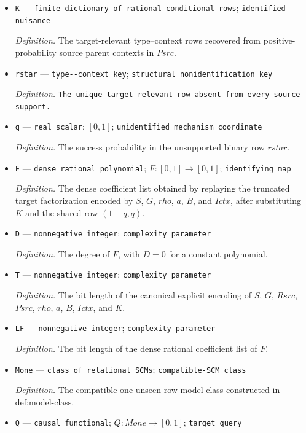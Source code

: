 \documentclass{article}
\begin{document}
\begin{itemize}
  \item \texttt{K} --- \texttt{finite dictionary of rational conditional rows}; \texttt{identified nuisance}
  \par\smallskip\noindent\emph{Definition.} The target-relevant type--context rows recovered from positive-probability source parent contexts in \(Psrc\).
  \item \texttt{rstar} --- \texttt{type-\allowbreak{}-\allowbreak{}context key}; \texttt{structural nonidentification key}
  \par\smallskip\noindent\emph{Definition.} \texttt{The unique target-\allowbreak{}relevant row absent from every source support.}
  \item \texttt{q} --- \texttt{real scalar}; \([0,1]\); \texttt{unidentified mechanism coordinate}
  \par\smallskip\noindent\emph{Definition.} The success probability in the unsupported binary row \(rstar\).
  \item \texttt{F} --- \texttt{dense rational polynomial}; \(F:[0,1]\to[0,1]\); \texttt{identifying map}
  \par\smallskip\noindent\emph{Definition.} The dense coefficient list obtained by replaying the truncated target factorization encoded by \(S\), \(G\), \(rho\), \(a\), \(B\), and \(Ictx\), after substituting \(K\) and the shared row \((1-q,q)\).
  \item \texttt{D} --- \texttt{nonnegative integer}; \texttt{complexity parameter}
  \par\smallskip\noindent\emph{Definition.} The degree of \(F\), with \(D=0\) for a constant polynomial.
  \item \texttt{T} --- \texttt{nonnegative integer}; \texttt{complexity parameter}
  \par\smallskip\noindent\emph{Definition.} The bit length of the canonical explicit encoding of \(S\), \(G\), \(Rsrc\), \(Psrc\), \(rho\), \(a\), \(B\), \(Ictx\), and \(K\).
  \item \texttt{LF} --- \texttt{nonnegative integer}; \texttt{complexity parameter}
  \par\smallskip\noindent\emph{Definition.} The bit length of the dense rational coefficient list of \(F\).
  \item \texttt{Mone} --- \texttt{class of relational SCMs}; \texttt{compatible-\allowbreak{}SCM class}
  \par\smallskip\noindent\emph{Definition.} The compatible one-unseen-row model class constructed in \(\text{def:model-class}\).
  \item \texttt{Q} --- \texttt{causal functional}; \(Q:Mone\to[0,1]\); \texttt{target query}

\end{itemize}
\end{document}

